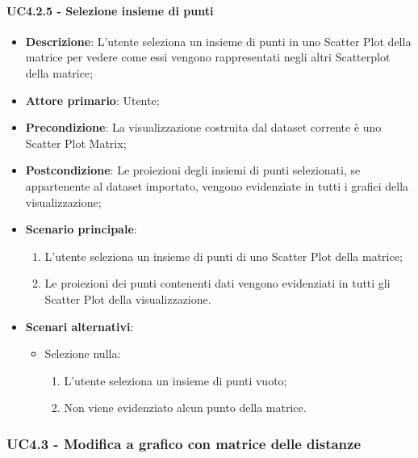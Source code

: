 \paragraph{UC4.2.5 - Selezione insieme di punti}
\label{par:uc4.2.5}
\begin{itemize}
    \item \textbf{Descrizione}: L'utente seleziona un insieme di punti in uno Scatter Plot della matrice per vedere come
                                essi vengono rappresentati negli altri Scatterplot della matrice;

    \item \textbf{Attore primario}: Utente;

    \item \textbf{Precondizione}:   La visualizzazione costruita dal dataset corrente è uno Scatter Plot Matrix;
    \item \textbf{Postcondizione}:  Le proiezioni degli insiemi di punti selezionati, se appartenente al dataset importato,
                                    vengono evidenziate in tutti i grafici della visualizzazione;

	\item \textbf{Scenario principale}:
        \begin{enumerate}
            \item L'utente seleziona un insieme di punti di uno Scatter Plot della matrice;
            \item Le proiezioni dei punti contenenti dati vengono evidenziati in tutti gli Scatter Plot della visualizzazione.
        \end{enumerate}

    \item \textbf{Scenari alternativi}:
    \begin{itemize}
        \item Selezione nulla:
        \begin{enumerate}
            \item L'utente seleziona un insieme di punti vuoto;
            \item Non viene evidenziato alcun punto della matrice.
        \end{enumerate}
    \end{itemize}    

\end{itemize}

\newpage
\subsubsection{UC4.3 - Modifica a grafico con matrice delle distanze}
\label{ssub:uc4.3}

